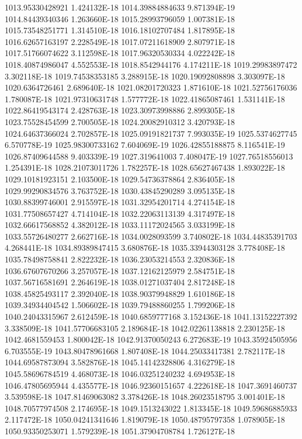 1013.95330428921  1.424132E-18
1014.39884884633  9.871394E-19
1014.84439340346  1.263660E-18
1015.28993796059  1.007381E-18
1015.73548251771  1.314510E-18
1016.18102707484  1.817895E-18
1016.62657163197  2.228549E-18
1017.07211618909  2.807971E-18
1017.51766074622  3.112598E-18
1017.96320530334  4.022242E-18
1018.40874986047  4.552553E-18
1018.8542944176  4.174211E-18
1019.29983897472  3.302118E-18
1019.74538353185  3.288915E-18
1020.19092808898  3.303097E-18
1020.6364726461  2.689640E-18
1021.08201720323  1.871610E-18
1021.52756176036  1.780087E-18
1021.97310631748  1.577772E-18
1022.41865087461  1.531141E-18
1022.86419543174  2.428763E-18
1023.30973998886  2.899305E-18
1023.75528454599  2.700505E-18
1024.20082910312  3.420793E-18
1024.64637366024  2.702857E-18
1025.09191821737  7.993035E-19
1025.5374627745  6.570778E-19
1025.98300733162  7.604069E-19
1026.42855188875  8.116541E-19
1026.87409644588  9.403339E-19
1027.319641003  7.408047E-19
1027.76518556013  1.254391E-18
1028.21073011726  1.782257E-18
1028.65627467438  1.893022E-18
1029.10181923151  2.103500E-18
1029.54736378864  2.836405E-18
1029.99290834576  3.763752E-18
1030.43845290289  3.095135E-18
1030.88399746001  2.915597E-18
1031.32954201714  4.274154E-18
1031.77508657427  4.714104E-18
1032.22063113139  4.317497E-18
1032.66617568852  4.382012E-18
1033.11172024565  3.033199E-18
1033.55726480277  2.662716E-18
1034.0028093599  3.740802E-18
1034.44835391703  4.268441E-18
1034.89389847415  3.680876E-18
1035.33944303128  3.778408E-18
1035.78498758841  2.822232E-18
1036.23053214553  2.320836E-18
1036.67607670266  3.257057E-18
1037.12162125979  2.584751E-18
1037.56716581691  2.264619E-18
1038.01271037404  2.817248E-18
1038.45825493117  2.392040E-18
1038.90379948829  1.610186E-18
1039.34934404542  1.506602E-18
1039.79488860255  1.799206E-18
1040.24043315967  2.612459E-18
1040.6859777168  3.152436E-18
1041.13152227392  3.338509E-18
1041.57706683105  2.189684E-18
1042.02261138818  2.230125E-18
1042.4681559453  1.800042E-18
1042.91370050243  6.272683E-19
1043.35924505956  6.703555E-19
1043.80478961668  1.807408E-18
1044.25033417381  2.782117E-18
1044.69587873094  3.582876E-18
1045.14142328806  4.316279E-18
1045.58696784519  4.468073E-18
1046.03251240232  4.694953E-18
1046.47805695944  4.435577E-18
1046.92360151657  4.222618E-18
1047.3691460737  3.539598E-18
1047.81469063082  3.378426E-18
1048.26023518795  3.001401E-18
1048.70577974508  2.174695E-18
1049.1513243022  1.813345E-18
1049.59686885933  2.117472E-18
1050.04241341646  1.819079E-18
1050.48795797358  1.078905E-18
1050.93350253071  1.579239E-18
1051.37904708784  1.726127E-18
